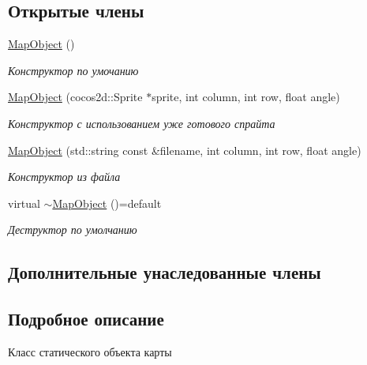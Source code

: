 \subsection*{Открытые члены}
\begin{DoxyCompactItemize}
\item 
\mbox{\label{classrtm_1_1_map_object_a5a739a68e3ff7439f083a998a7760287}} 
\hyperlink{classrtm_1_1_map_object_a5a739a68e3ff7439f083a998a7760287}{Map\+Object} ()
\begin{DoxyCompactList}\small\item\em Конструктор по умочанию \end{DoxyCompactList}\item 
\hyperlink{classrtm_1_1_map_object_a39e9366932d38519d7358f74ebee9fa4}{Map\+Object} (cocos2d\+::\+Sprite $\ast$sprite, int column, int row, float angle)
\begin{DoxyCompactList}\small\item\em Конструктор с использованием уже готового спрайта \end{DoxyCompactList}\item 
\hyperlink{classrtm_1_1_map_object_ae4fbfe3193009e9e92140dc946a31bcc}{Map\+Object} (std\+::string const \&filename, int column, int row, float angle)
\begin{DoxyCompactList}\small\item\em Конструктор из файла \end{DoxyCompactList}\item 
\mbox{\label{classrtm_1_1_map_object_ae54a583ef69280a7b813f370979bd1b7}} 
virtual \hyperlink{classrtm_1_1_map_object_ae54a583ef69280a7b813f370979bd1b7}{$\sim$\+Map\+Object} ()=default
\begin{DoxyCompactList}\small\item\em Деструктор по умолчанию \end{DoxyCompactList}\end{DoxyCompactItemize}
\subsection*{Дополнительные унаследованные члены}


\subsection{Подробное описание}
Класс статического объекта карты 

